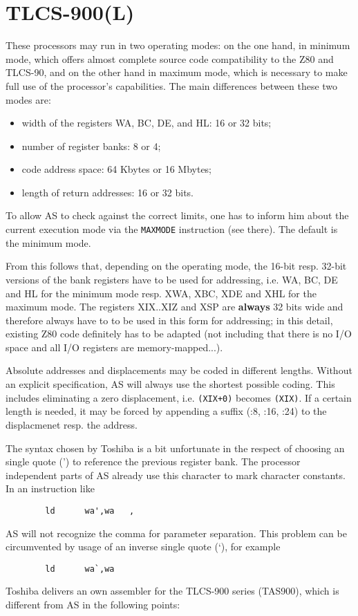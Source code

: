 \documentclass[12pt,twoside]{report}
\newcommand{\bb}[1]{{\bf #1}}
\newcommand{\tty}[1]{{\tt #1}}
\begin{document}

\section{TLCS-900(L)}
\label{TLCS900Spec}

These processors may run in two operating modes: on the one hand, in
minimum mode, which offers almost complete source code compatibility
to the Z80 and TLCS-90, and on the other hand in maximum mode, which
is necessary to make full use of the processor's capabilities.  The
main differences between these two modes are:
\begin{itemize}
\item{width of the registers WA, BC, DE, and HL: 16 or 32 bits;}
\item{number of register banks: 8 or 4;}
\item{code address space: 64 Kbytes or 16 Mbytes;}
\item{length of return addresses: 16 or 32 bits.}
\end{itemize}
To allow AS to check against the correct limits, one has to inform him
about the current execution mode via the \tty{MAXMODE} instruction (see
there).  The default is the minimum mode.

From this follows that, depending on the operating mode, the 16-bit
resp. 32-bit versions of the bank registers have to be used for
addressing, i.e. WA, BC, DE and HL for the minimum mode resp. XWA,
XBC, XDE and XHL for the maximum mode.  The registers XIX..XIZ and
XSP are \bb{always} 32 bits wide and therefore always have to to be used
in this form for addressing; in this detail, existing Z80 code
definitely has to be adapted (not including that there is no I/O
space and all I/O registers are memory-mapped...).

Absolute addresses and displacements may be coded in different
lengths.  Without an explicit specification, AS will always use
the shortest possible coding.  This includes eliminating a zero
displacement, i.e. \verb!(XIX+0)! becomes \verb!(XIX)!.  If a certain
length is needed, it may be forced by appending a suffix (:8, :16,
:24) to the displacmenet resp. the address.

The syntax chosen by Toshiba is a bit unfortunate in the respect of
choosing an single quote (') to reference the previous register bank.  The
processor independent parts of AS already use this character to mark
character constants.  In an instruction like
\begin{verbatim}
        ld      wa',wa   ,
\end{verbatim}
AS will not recognize the comma for parameter separation.  This
problem can be circumvented by usage of an inverse single quote (`), for
example
\begin{verbatim}
        ld      wa`,wa
\end{verbatim}
Toshiba delivers an own assembler for the TLCS-900 series (TAS900),
which is different from AS in the following points:
\end{document}
